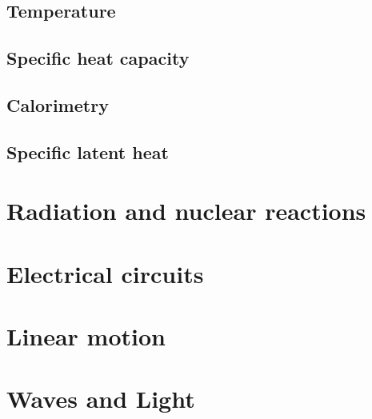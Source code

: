 \documentclass{book}
\begin{document}
\section{Temperature}

\section{Specific heat capacity}

\section{Calorimetry}

\section{Specific latent heat}

\chapter{Radiation and nuclear reactions}


\chapter{Electrical circuits}

\chapter{Linear motion}

\chapter{Waves and Light}
\end{document}
